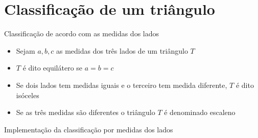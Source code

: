 \section{Classificação de um triângulo}

\begin{frame}[fragile]{Classificação de acordo com as medidas dos lados}

    \begin{itemize}
        \item Sejam $a, b, c$ as medidas dos três lados de um triângulo $T$
        \pause

        \item $T$ é dito equilátero se $a = b = c$
        \pause

        \item Se dois lados tem medidas iguais e o terceiro tem medida diferente, $T$ é dito
            isóceles
        \pause

        \item Se as três medidas são diferentes o triângulo $T$ é denominado escaleno

    \end{itemize}

\end{frame}

\begin{frame}[fragile]{Implementação da classificação por medidas dos lados}
\end{frame}


